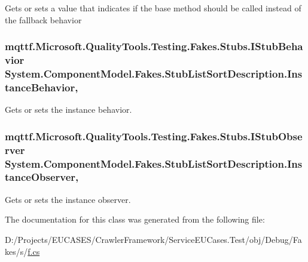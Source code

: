 Gets or sets a value that indicates if the base method should be called instead of the fallback behavior

\hypertarget{class_system_1_1_component_model_1_1_fakes_1_1_stub_list_sort_description_a7e8970c651791f386de3fa7354e79675}{
\subsubsection[{Instance\-Behavior}]{\setlength{\rightskip}{0pt plus 5cm}mqttf.\-Microsoft.\-Quality\-Tools.\-Testing.\-Fakes.\-Stubs.\-I\-Stub\-Behavior System.\-Component\-Model.\-Fakes.\-Stub\-List\-Sort\-Description.\-Instance\-Behavior\hspace{0.3cm}{\ttfamily [get]}, {\ttfamily [set]}}}\label{class_system_1_1_component_model_1_1_fakes_1_1_stub_list_sort_description_a7e8970c651791f386de3fa7354e79675}


Gets or sets the instance behavior.

\hypertarget{class_system_1_1_component_model_1_1_fakes_1_1_stub_list_sort_description_a3e3b7b7cffa63e5487b44775b31f9003}{
\subsubsection[{Instance\-Observer}]{\setlength{\rightskip}{0pt plus 5cm}mqttf.\-Microsoft.\-Quality\-Tools.\-Testing.\-Fakes.\-Stubs.\-I\-Stub\-Observer System.\-Component\-Model.\-Fakes.\-Stub\-List\-Sort\-Description.\-Instance\-Observer\hspace{0.3cm}{\ttfamily [get]}, {\ttfamily [set]}}}\label{class_system_1_1_component_model_1_1_fakes_1_1_stub_list_sort_description_a3e3b7b7cffa63e5487b44775b31f9003}


Gets or sets the instance observer.



The documentation for this class was generated from the following file\-:\begin{DoxyCompactItemize}
\item 
D\-:/\-Projects/\-E\-U\-C\-A\-S\-E\-S/\-Crawler\-Framework/\-Service\-E\-U\-Cases.\-Test/obj/\-Debug/\-Fakes/s/\hyperlink{s_2f_8cs}{f.\-cs}\end{DoxyCompactItemize}
